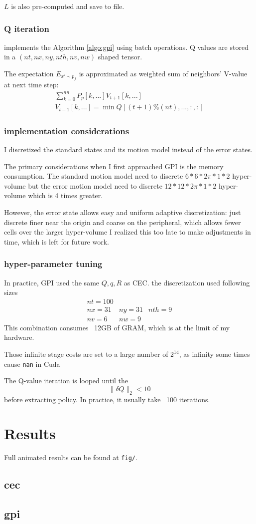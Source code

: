 \documentclass[conference]{IEEEtran}
\begin{document}
$L$ is also pre-computed and save to file.

\subsubsection{Q iteration}
implements the Algorithm \ref{algo:gpi} using batch operations.
Q values are stored in a $(nt, nx, ny, nth, nv, nw)$ shaped tensor.

The expectation $E_{x' \sim p_f}$ is approximated as weighted sum of 
neighbors' V-value at next time step:
$$
\begin{gathered}
\sum_{k=0}^{nn}P_p[k,...]V_{t+1}[k,...]\\
V_{t+1}[k,...]=\min Q[(t+1)\%(nt), ..., :, :]
\end{gathered}
$$


\subsubsection{implementation considerations}
I discretized the standard states and its motion model instead of the error states.

The primary considerations when I first approached GPI is the memory consumption.
The standard motion model need to discrete $6*6*2\pi*1*2$ hyper-volume 
but the error motion model need to discrete $12*12*2\pi*1*2$ hyper-volume which is 4 times greater.

However, the error state allows easy and uniform adaptive discretization: 
just discrete finer near the origin and coarse on the peripheral, 
which allows fewer cells over the larger hyper-volume
I realized this too late to make adjustments in time, which is left for future work.

\subsubsection{hyper-parameter tuning}
In practice, GPI used the same $Q,q,R$ as CEC. the discretization used following sizes
\[
\begin{array}{lll}nt=100&&\\ nx=31&ny=31&nth=9\\ nv=6&nw=9&\end{array} 
\]
This combination consumes ~12GB of GRAM, which is at the limit of my hardware.

Those infinite stage costs are set to a large number of $2^{14}$, 
as infinity some times cause \texttt{nan} in Cuda

The Q-value iteration is looped until the 
$$\|\delta Q\|_2 < 10$$
before extracting policy. In practice, it usually take ~100 iterations.



\section{Results}
Full animated results can be found at \texttt{fig/}.

\subsection{cec}

\subsection{gpi}
\end{document}
